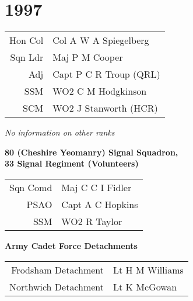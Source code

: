 \chapter*{1997}

\begin{center}
  \small
  \begin{tabular}{rl}
    Hon Col & Col A W A Spiegelberg \\
    Sqn Ldr & Maj P M Cooper \\
    Adj & Capt P C R Troup (QRL) \\
    SSM & WO2 C M Hodgkinson \\
    SCM & WO2 J Stanworth (HCR) \\
  \end{tabular}
\end{center}

\begin{center}
  \textit{No information on other ranks}
\end{center}

\begin{center}
  \Large
  \textbf{80 (Cheshire Yeomanry) Signal Squadron, \\ 33 Signal Regiment (Volunteers)}
\end{center}

\begin{center}
  \small
  \begin{tabular}{rl}
    Sqn Comd & Maj C C I Fidler \\
    PSAO & Capt A C Hopkins \\
    SSM & WO2 R Taylor \\
  \end{tabular}
\end{center}

\begin{center}
  \Large
  \textbf{Army Cadet Force Detachments}
\end{center}

\begin{center}
  \small
  \begin{tabular}{rl}
    Frodsham Detachment & Lt H M Williams \\
    Northwich Detachment & Lt K McGowan \\
  \end{tabular}
\end{center}

\vspace{50mm}

\pagebreak
